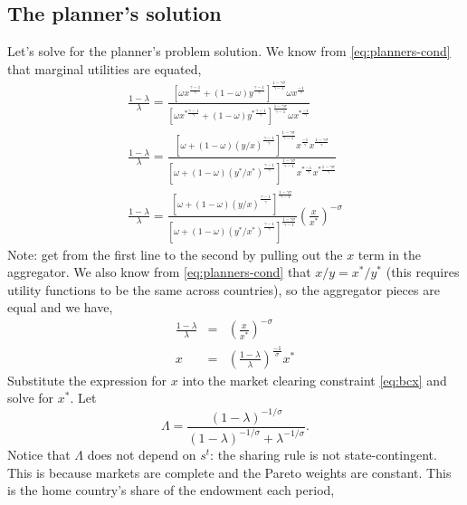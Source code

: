 \documentclass[11pt,pdftex,twoside,letterpaper]{exam}
\begin{document}
 \subsection{The planner's solution}
 Let's solve for the planner's problem solution. We know from \eqref{eq:planners-cond} that marginal utilities are equated,
 \begin{eqnarray}
   \frac{1-\lambda}{\lambda} = \frac{\left[ \omega x^{\frac{\gamma-1}{\gamma}} + (1-\omega)y^\frac{\gamma-1}{\gamma} \right] ^\frac{1-\gamma \sigma}{\gamma-1} \omega x^\frac{-1}{\gamma}}{\left[ \omega x^{*\frac{\gamma-1}{\gamma}} + (1-\omega)y^{*\frac{\gamma-1}{\gamma}} \right] ^\frac{1-\gamma \sigma}{\gamma-1} \omega x^{*\frac{-1}{\gamma}}} \\
    \frac{1-\lambda}{\lambda} = \frac{\left[ \omega  + (1-\omega)(y/x)^\frac{\gamma-1}{\gamma} \right] ^\frac{1-\gamma \sigma}{\gamma-1} x^\frac{-1}{\gamma} x^\frac{1-\gamma\sigma}{\gamma}}{\left[ \omega+ (1-\omega)(y^*/x^*)^{\frac{\gamma-1}{\gamma}} \right] ^\frac{1-\gamma \sigma}{\gamma-1}x^{*\frac{-1}{\gamma}}x^{*\frac{1-\gamma\sigma}{\gamma}}}\\
    \frac{1-\lambda}{\lambda} = \frac{\left[ \omega  + (1-\omega)(y/x)^\frac{\gamma-1}{\gamma} \right] ^\frac{1-\gamma \sigma}{\gamma-1} }{\left[ \omega+ (1-\omega)(y^*/x^*)^{\frac{\gamma-1}{\gamma}} \right] ^\frac{1-\gamma \sigma}{\gamma-1}}\left(\frac{x}{x^*}\right)^{-\sigma}
 \end{eqnarray}
 Note: get from the first line to the second by pulling out the $x$ term in the aggregator. We also know from \eqref{eq:planners-cond} that $x/y=x^*/y^*$ (this requires utility functions to be the same across countries), so the aggregator pieces are equal and we have,
 \begin{eqnarray}
   \frac{1-\lambda}{\lambda} &=&\left(\frac{x}{x^*}\right)^{-\sigma}\\
   x &=& \left(\frac{1-\lambda}{\lambda}\right)^\frac{-1}{\sigma}x^*
 \end{eqnarray}
 Substitute the expression for $x$ into the market clearing constraint \eqref{eq:bcx} and solve for $x^*$. Let
 \begin{equation}\label{eq:Lambda}
   \Lambda=\frac{(1-\lambda)^{-1/\sigma}}{(1-\lambda)^{-1/\sigma}+\lambda^{-1/\sigma}}.
 \end{equation}
 Notice that $\Lambda$ does not depend on $s^t$: the sharing rule is not state-contingent. This is because markets are complete and the Pareto weights are constant.  This is the home country's share of the endowment each period,
\end{document}
